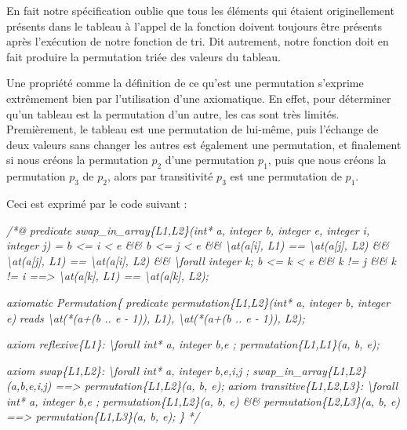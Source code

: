 \documentclass[12pt,francais,]{scrbook}
\newenvironment{Shaded}{}{}
\newcommand{\CommentTok}[1]{\textcolor[rgb]{0.38,0.63,0.69}{\textit{{#1}}}}
\begin{document}
En fait notre spécification oublie que tous les éléments qui étaient
originellement présents dans le tableau à l'appel de la fonction doivent
toujours être présents après l'exécution de notre fonction de tri. Dit
autrement, notre fonction doit en fait produire la permutation triée des
valeurs du tableau.

Une propriété comme la définition de ce qu'est une permutation s'exprime
extrêmement bien par l'utilisation d'une axiomatique. En effet, pour
déterminer qu'un tableau est la permutation d'un autre, les cas sont
très limités. Premièrement, le tableau est une permutation de lui-même,
puis l'échange de deux valeurs sans changer les autres est également une
permutation, et finalement si nous créons la permutation \(p_2\) d'une
permutation \(p_1\), puis que nous créons la permutation \(p_3\) de
\(p_2\), alors par transitivité \(p_3\) est une permutation de \(p_1\).

Ceci est exprimé par le code suivant :

\begin{footnotesize}\begin{Shaded}
\begin{Highlighting}[]
\CommentTok{/*@}
\CommentTok{  predicate swap_in_array\{L1,L2\}(int* a, integer b, integer e, integer i, integer j) =}
\CommentTok{    b <= i < e && b <= j < e &&}
\CommentTok{    \textbackslash{}at(a[i], L1) == \textbackslash{}at(a[j], L2) && \textbackslash{}at(a[j], L1) == \textbackslash{}at(a[i], L2) &&}
\CommentTok{    \textbackslash{}forall integer k; b <= k < e && k != j && k != i ==> \textbackslash{}at(a[k], L1) == \textbackslash{}at(a[k], L2);}

\CommentTok{  axiomatic Permutation\{}
\CommentTok{    predicate permutation\{L1,L2\}(int* a, integer b, integer e)}
\CommentTok{     reads \textbackslash{}at(*(a+(b .. e - 1)), L1), \textbackslash{}at(*(a+(b .. e - 1)), L2);}

\CommentTok{    axiom reflexive\{L1\}: }
\CommentTok{      \textbackslash{}forall int* a, integer b,e ; permutation\{L1,L1\}(a, b, e);}

\CommentTok{    axiom swap\{L1,L2\}:}
\CommentTok{      \textbackslash{}forall int* a, integer b,e,i,j ;}
\CommentTok{        swap_in_array\{L1,L2\}(a,b,e,i,j) ==> permutation\{L1,L2\}(a, b, e);}
\CommentTok{    }
\CommentTok{    axiom transitive\{L1,L2,L3\}:}
\CommentTok{      \textbackslash{}forall int* a, integer b,e ; }
\CommentTok{        permutation\{L1,L2\}(a, b, e) && permutation\{L2,L3\}(a, b, e) ==> permutation\{L1,L3\}(a, b, e);}
\CommentTok{  \}}
\CommentTok{*/}
\end{Highlighting}
\end{Shaded}\end{footnotesize}
\end{document}
